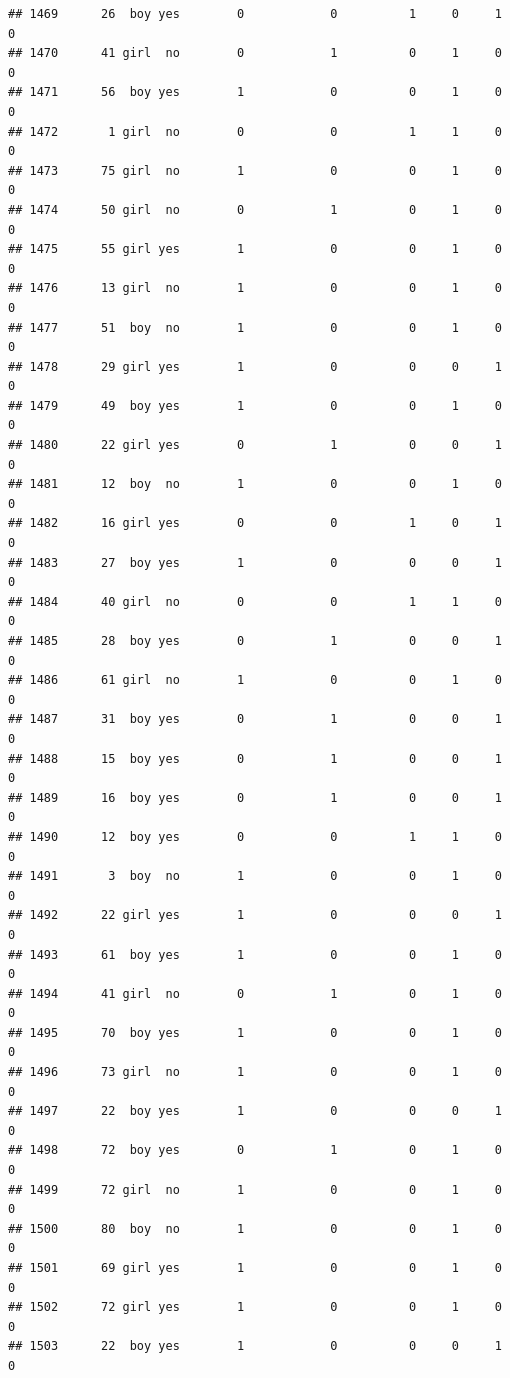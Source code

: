 \documentclass[man]{apa6}
\begin{document}
\begin{verbatim}
## 1469      26  boy yes        0            0          1     0     1     0
## 1470      41 girl  no        0            1          0     1     0     0
## 1471      56  boy yes        1            0          0     1     0     0
## 1472       1 girl  no        0            0          1     1     0     0
## 1473      75 girl  no        1            0          0     1     0     0
## 1474      50 girl  no        0            1          0     1     0     0
## 1475      55 girl yes        1            0          0     1     0     0
## 1476      13 girl  no        1            0          0     1     0     0
## 1477      51  boy  no        1            0          0     1     0     0
## 1478      29 girl yes        1            0          0     0     1     0
## 1479      49  boy yes        1            0          0     1     0     0
## 1480      22 girl yes        0            1          0     0     1     0
## 1481      12  boy  no        1            0          0     1     0     0
## 1482      16 girl yes        0            0          1     0     1     0
## 1483      27  boy yes        1            0          0     0     1     0
## 1484      40 girl  no        0            0          1     1     0     0
## 1485      28  boy yes        0            1          0     0     1     0
## 1486      61 girl  no        1            0          0     1     0     0
## 1487      31  boy yes        0            1          0     0     1     0
## 1488      15  boy yes        0            1          0     0     1     0
## 1489      16  boy yes        0            1          0     0     1     0
## 1490      12  boy yes        0            0          1     1     0     0
## 1491       3  boy  no        1            0          0     1     0     0
## 1492      22 girl yes        1            0          0     0     1     0
## 1493      61  boy yes        1            0          0     1     0     0
## 1494      41 girl  no        0            1          0     1     0     0
## 1495      70  boy yes        1            0          0     1     0     0
## 1496      73 girl  no        1            0          0     1     0     0
## 1497      22  boy yes        1            0          0     0     1     0
## 1498      72  boy yes        0            1          0     1     0     0
## 1499      72 girl  no        1            0          0     1     0     0
## 1500      80  boy  no        1            0          0     1     0     0
## 1501      69 girl yes        1            0          0     1     0     0
## 1502      72 girl yes        1            0          0     1     0     0
## 1503      22  boy yes        1            0          0     0     1     0

\end{verbatim}
\end{document}
